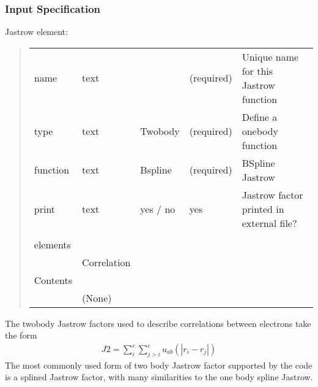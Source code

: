 \documentclass[letterpaper,10pt,english]{sphinxmanual}
\begin{document}
\subsubsection{Input Specification}
\label{\detokenize{intro_wavefunction:id8}}
Jastrow element:
\begin{quote}


\begin{savenotes}\sphinxattablestart
\centering
\begin{tabulary}{\linewidth}[t]{|T|T|T|T|T|}
\hline

&
&
&
&
\\
\hline
name
&
text
&&
(required)
&
Unique name
for this
Jastrow
function
\\
\hline
type
&
text
&
Two\sphinxhyphen{}body
&
(required)
&
Define a
one\sphinxhyphen{}body
function
\\
\hline
function
&
text
&
Bspline
&
(required)
&
BSpline
Jastrow
\\
\hline
print
&
text
&
yes / no
&
yes
&
Jastrow
factor
printed in
external
file?
\\
\hline&&&&\\
\hline
elements
&&&&\\
\hline&
Correlation
&&&\\
\hline
Contents
&&&&\\
\hline&
(None)
&&&\\
\hline
\end{tabulary}
\par
\sphinxattableend\end{savenotes}
\end{quote}

The two\sphinxhyphen{}body Jastrow factors used to describe correlations between electrons take the form
\begin{equation}\label{equation:intro_wavefunction:eq14}
\begin{split}J2=\sum_i^{e}\sum_{j>i}^{e} u_{ab}(|r_i-r_j|)\end{split}
\end{equation}
The most commonly used form of two body Jastrow factor supported by the code is a splined
Jastrow factor, with many similarities to the one body spline Jastrow.
\end{document}
